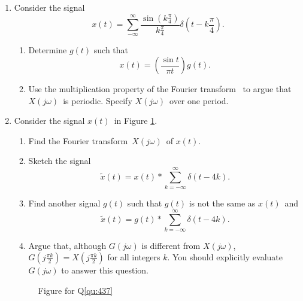 \documentclass[11pt]{article}
\newcommand\ft{Fourier transform}
\newcommand\xt{$x(t)$}
\newcommand\xo{$X(j\omega)$}
\begin{document}
\begin{enumerate}
    \item Consider the signal
    \begin{equation*}
        x(t) = \sum_{-\infty}^{\infty}\frac{\sin\left(k\frac{\pi}{4}\right)}{k\frac{\pi}{4}}\delta\left(t - k\frac{\pi}{4}\right).
    \end{equation*}
    \begin{enumerate}
        \item Determine $g(t)$ such that
        \begin{equation*}
            x(t) = \left(\frac{\sin t}{\pi t}\right)g(t).
        \end{equation*}
        \item Use the multiplication property of the \ft~ to argue that \xo~is periodic. Specify \xo~over one period.
    \end{enumerate}

   \item \label{qu:437} Consider the signal \xt~in Figure \ref{fi:q437}.
   \begin{enumerate}
        \item Find the \ft~\xo~of \xt.
        \item Sketch the signal
        \begin{equation*}
          \tilde{x}(t) = x(t)\ast \sum_{k = -\infty}^{\infty}\delta(t-4k).
        \end{equation*}
        \item Find another signal $g(t)$ such that $g(t)$ is not the same as \xt~and
        \begin{equation*}
          \tilde{x}(t) = g(t)\ast \sum_{k = -\infty}^{\infty}\delta(t-4k).
        \end{equation*}
        \item Argue that, although $G(j\omega)$ is different from \xo,   $G(j\frac{\pi k}{2}) = X(j\frac{\pi k}{2})$   for all integers $k$. You should explicitly evaluate  $G(j\omega)$ to answer this question.
   \end{enumerate}
    \begin{figure}
      \centering
      
      \caption{Figure for Q\ref{qu:437}}\label{fi:q437}
    \end{figure}


\end{enumerate}
\end{document}
